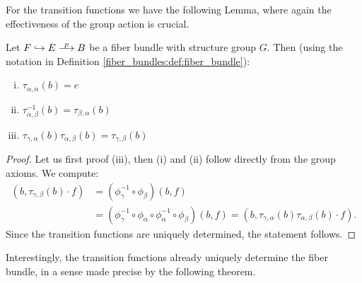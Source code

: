     For the transition functions we have the following Lemma, where again the effectiveness of the group action is crucial.

    \begin{lemma}
        \label{lem:transition_functions}
        Let $F \hookrightarrow E \oset[0.5pt]{\scalebox{0.8}{$p$}}{\longrightarrow} B$ be a fiber bundle with structure group $G$. Then (using the notation in Definition \ref{fiber_bundles:def:fiber_bundle}):
        \begin{enumerate}[(i)]
            \item $\tau_{\alpha,\alpha}(b) = e$
            \item $\tau_{\alpha,\beta}^{-1}(b) = \tau_{\beta,\alpha}(b)$
            \item $\tau_{\gamma,\alpha}(b)\tau_{\alpha,\beta}(b) = \tau_{\gamma,\beta}(b)$
        \end{enumerate}
    \end{lemma}
    \begin{proof}
        Let us first proof (iii), then (i) and (ii) follow directly from the group axioms. We compute:
        \begin{align*}
            (b,\tau_{\gamma,\beta}(b) \cdot f) & = (\phi_\gamma^{-1} \circ \phi_\beta)(b,f) \\ & = (\phi_\gamma^{-1} \circ \phi_\alpha \circ \phi_\alpha^{-1} \circ \phi_\beta)(b,f) = (b,\tau_{\gamma,\alpha}(b)\tau_{\alpha,\beta}(b) \cdot f).
        \end{align*}
        Since the transition functions are uniquely determined, the statement follows. 
    \end{proof}

     Interestingly, the transition functions already uniquely determine the fiber bundle, in a sense made precise by the following theorem.

